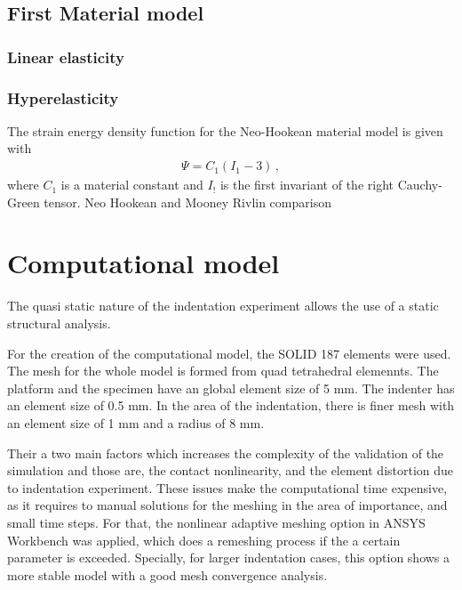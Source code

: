 \subsection{First Material model}

\subsubsection{Linear elasticity}


\subsubsection{Hyperelasticity}
The strain energy density function for the Neo-Hookean material model is given with
\begin{align*}
            \Psi = C_1 (I_1 - 3) \, ,
\end{align*}
where $C_1$ is a material constant and $I_!$ is the first invariant of the right Cauchy-Green tensor. 
Neo Hookean and Mooney Rivlin comparison


\section{Computational model}
The quasi static nature of the indentation experiment allows the use of a static 
structural analysis.

For the creation of the computational model, the SOLID 187 elements were used. The mesh 
for the whole model is formed from quad tetrahedral elemennts. The platform and 
the specimen have an global element size of 5 mm. The indenter has an element size of
0.5 mm. In the area of the indentation, there is finer mesh with an element size of
1 mm and a radius of 8 mm. 

Their a two main factors which increases the complexity of the validation of the simulation
and those are, the contact nonlinearity, and the element distortion due to indentation
 experiment. These issues make the computational time expensive, as it requires to manual 
 solutions for the meshing in the area of importance, and small time steps. 
 For that, 
 the nonlinear adaptive meshing option in ANSYS Workbench was applied, which does a remeshing
 process if the a certain parameter is exceeded.%
Specially, for larger indentation cases, this option shows a more stable model with a 
good mesh convergence analysis.

